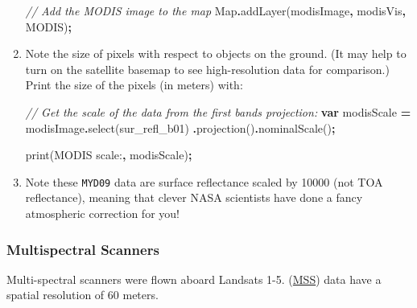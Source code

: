 \documentclass[
]{article}
\newenvironment{Shaded}{\begin{snugshade}}{\end{snugshade}}
\newcommand{\BuiltInTok}[1]{#1}
\newcommand{\CommentTok}[1]{\textcolor[rgb]{0.56,0.35,0.01}{\textit{#1}}}
\newcommand{\FunctionTok}[1]{\textcolor[rgb]{0.00,0.00,0.00}{#1}}
\newcommand{\KeywordTok}[1]{\textcolor[rgb]{0.13,0.29,0.53}{\textbf{#1}}}
\newcommand{\NormalTok}[1]{#1}
\newcommand{\OperatorTok}[1]{\textcolor[rgb]{0.81,0.36,0.00}{\textbf{#1}}}
\newcommand{\StringTok}[1]{\textcolor[rgb]{0.31,0.60,0.02}{#1}}
\begin{document}
\begin{enumerate}
\begin{Shaded}
\begin{Highlighting}[]
\CommentTok{// Add the MODIS image to the map}
\BuiltInTok{Map}\OperatorTok{.}\FunctionTok{addLayer}\NormalTok{(modisImage}\OperatorTok{,}\NormalTok{ modisVis}\OperatorTok{,} \StringTok{\textquotesingle{}MODIS\textquotesingle{}}\NormalTok{)}\OperatorTok{;}
\end{Highlighting}
\end{Shaded}
\item
  Note the size of pixels with respect to objects on the ground. (It may help to turn on the satellite basemap to see high-resolution data for comparison.) Print the size of the pixels (in meters) with:

\begin{Shaded}
\begin{Highlighting}[]
\CommentTok{// Get the scale of the data from the first band\textquotesingle{}s projection:}
\KeywordTok{var}\NormalTok{ modisScale }\OperatorTok{=}\NormalTok{ modisImage}\OperatorTok{.}\FunctionTok{select}\NormalTok{(}\StringTok{\textquotesingle{}sur\_refl\_b01\textquotesingle{}}\NormalTok{)}
\OperatorTok{.}\FunctionTok{projection}\NormalTok{()}\OperatorTok{.}\FunctionTok{nominalScale}\NormalTok{()}\OperatorTok{;}

\FunctionTok{print}\NormalTok{(}\StringTok{\textquotesingle{}MODIS scale:\textquotesingle{}}\OperatorTok{,}\NormalTok{ modisScale)}\OperatorTok{;}
\end{Highlighting}
\end{Shaded}
\item
  Note these \texttt{MYD09} data are surface reflectance scaled by 10000 (not TOA reflectance), meaning that clever NASA scientists have done a fancy atmospheric correction for you!
\end{enumerate}

\hypertarget{multispectral-scanners}{%
\subsubsection{Multispectral Scanners}\label{multispectral-scanners}}

Multi-spectral scanners were flown aboard Landsats 1-5. (\href{https://landsat.gsfc.nasa.gov/multispectral-scanner-system}{MSS}) data have a spatial resolution of 60 meters.
\end{document}
